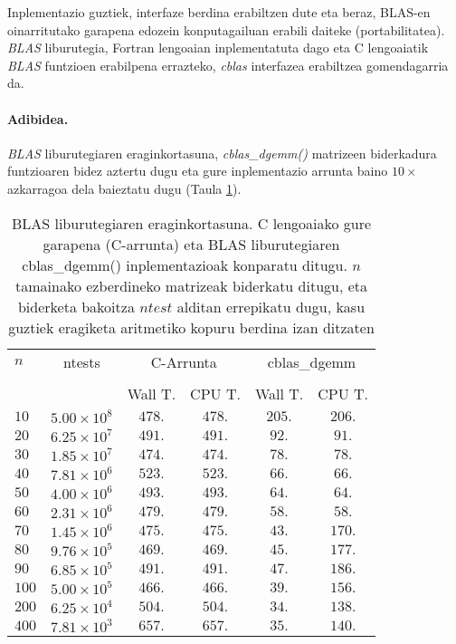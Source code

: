 Inplementazio guztiek, interfaze berdina erabiltzen dute eta beraz, BLAS-en oinarritutako garapena edozein konputagailuan erabili daiteke (portabilitatea). \emph{BLAS} liburutegia, Fortran lengoaian inplementatuta dago eta C lengoaiatik \emph{BLAS} funtzioen erabilpena errazteko, \emph{cblas} interfazea erabiltzea gomendagarria da. 

\paragraph{Adibidea.}\emph{BLAS} liburutegiaren eraginkortasuna, \emph{cblas\_dgemm()} matrizeen biderkadura funtzioaren  bidez aztertu dugu eta gure inplementazio arrunta baino $10\times$ azkarragoa dela baieztatu dugu (Taula \ref{tab:blas}). 

\begin{table}[h]
\caption[BLAS liburutegiaren eraginkortasuna] 
{\small{BLAS liburutegiaren eraginkortasuna. C lengoaiako gure garapena (C-arrunta) eta BLAS liburutegiaren cblas\_dgemm() inplementazioak konparatu ditugu. $n$ tamainako ezberdineko matrizeak biderkatu ditugu, eta biderketa bakoitza $ntest$ alditan errepikatu dugu, kasu guztiek eragiketa aritmetiko kopuru berdina izan ditzaten}}
\label{tab:blas}      
\centering
{%
\begin{tabular}{l c c c c c } 
 \hline
  $n$     & ntests        &  \multicolumn{2}{c}{C-Arrunta}  & \multicolumn{2}{c}{cblas\_dgemm} \\
 \\
          &                   & Wall T. & CPU T. &  Wall T. & CPU T. \\
 \hline         
 $10$  &   $5.00\times10^8$   & $478.$   & $478.$  & $205.$  & $206.$   \\ 
 $20$  &   $6.25\times10^7$   & $491.$   &  $491.$  & $92.$   & $91.$   \\ 
 $30$  &   $1.85\times10^7$   & $474.$    & $474.$ & $78.$   & $78.$   \\ 
 $40$  &   $7.81\times10^6$   & $523.$    & $523.$ & $66.$   & $66.$   \\ 
 $50$  &   $4.00\times10^6$   & $493.$    & $493.$ & $64.$   & $64.$   \\ 
 $60$  &   $2.31\times10^6$   & $479.$    & $479.$ & $58.$   & $58.$   \\ 
 $70$  &   $1.45\times10^6$   & $475.$    & $475.$ & $43.$   & $170.$   \\ 
 $80$  &   $9.76\times10^5$   & $469.$    & $469.$ & $45.$   & $177.$   \\ 
 $90$  &   $6.85\times10^5$   & $491.$    & $491.$ & $47.$   & $186.$   \\ 
 $100$ &   $5.00\times10^5$   & $466.$    & $466.$ & $39.$   & $156.$   \\ 
 $200$ &   $6.25\times10^4$   & $504.$    & $504.$ & $34.$   & $138.$   \\ 
 $400$ &   $7.81\times10^3$   & $657.$    & $657.$ & $35.$   & $140.$   \\ 
   \hline
 \end{tabular}}
\end{table}   

